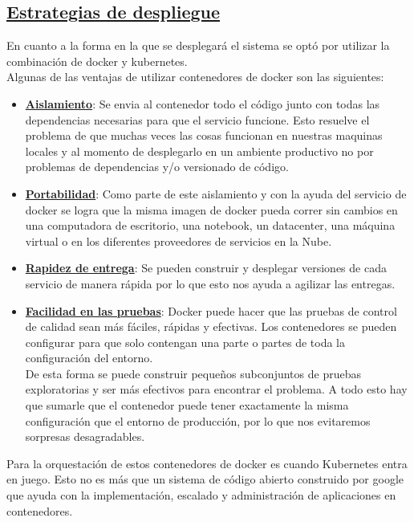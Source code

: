 \subsection*{\underline{Estrategias de despliegue}}
En cuanto a la forma en la que se desplegará el sistema se optó por utilizar la combinación de docker y kubernetes.\\
Algunas de las ventajas de utilizar contenedores de docker son las siguientes:

\begin{itemize}
	\item \textbf{\underline{Aislamiento}}: Se envia al contenedor todo el código  junto con todas las dependencias necesarias para que el servicio funcione. Esto resuelve el problema de que muchas veces las cosas funcionan en nuestras maquinas locales y al momento de desplegarlo en un ambiente productivo no por problemas de dependencias y/o versionado de código.
	\item \textbf{\underline{Portabilidad}}: Como parte de este aislamiento y con la ayuda del servicio de docker se logra que la misma imagen de docker pueda correr sin cambios en una computadora de escritorio, una notebook, un datacenter, una máquina virtual o en los diferentes proveedores de servicios en la Nube.
	\item \textbf{\underline{Rapidez de entrega}}: Se pueden construir y desplegar versiones de cada servicio de manera rápida por lo que esto nos ayuda a agilizar las entregas. 
	\item \textbf{\underline{Facilidad en las pruebas}}: Docker puede hacer que las pruebas de control de calidad sean más fáciles, rápidas y efectivas. Los contenedores se pueden configurar para que solo contengan una parte o partes de toda la configuración del entorno. \\
De esta forma se puede construir pequeños subconjuntos de pruebas exploratorias y ser más efectivos para encontrar el problema. A todo esto hay que sumarle que el contenedor puede tener exactamente la misma configuración que el entorno de producción, por lo que nos evitaremos sorpresas desagradables.\\
\end{itemize}

Para la orquestación de estos contenedores de docker es cuando Kubernetes entra en juego. Esto no es más que un sistema de código abierto construido por google que ayuda con la implementación, escalado y administración de aplicaciones en contenedores. \\

